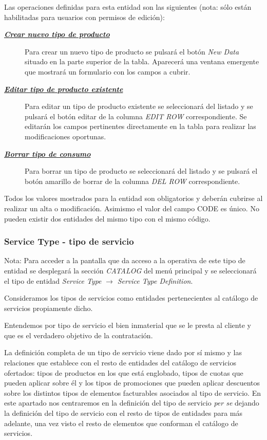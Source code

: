 Las operaciones definidas para esta entidad son las siguientes (nota: sólo están habilitadas para usuarios con permisos de edición):
\begin{description}
\item[\underline{\textsl{\textbf{Crear nuevo tipo de producto}}}] Para crear un nuevo tipo de producto se pulsará el botón \textit{New Data} situado en la parte superior de la tabla. Aparecerá una ventana emergente que mostrará un formulario con los campos a cubrir.

\item[\underline{\textsl{\textbf{Editar tipo de producto existente}}}] Para editar un tipo de producto existente se seleccionará del listado y se pulsará el botón editar de la columna \textit{EDIT ROW} correspondiente. Se editarán los campos pertinentes directamente en la tabla para realizar las modificaciones oportunas. 

\item[\underline{\textsl{\textbf{Borrar tipo de consumo}}}] Para borrar un tipo de producto se seleccionará del listado y se pulsará el botón amarillo de borrar de la columna \textit{DEL ROW} correspondiente.
\end{description}

Todos los valores mostrados para la entidad son obligatorios y deberán cubrirse al realizar un alta o modificación. Asimismo el valor del campo CODE es único. No pueden existir dos entidades del mismo tipo con el mismo código.




\subsubsection{Service Type - tipo de servicio}
\label{sub:service-type}

Nota: Para acceder a la pantalla que da acceso a la operativa de este tipo de entidad se desplegará la sección \emph{CATALOG} del menú principal y se seleccionará el tipo de entidad \emph{Service Type} $\rightarrow$  \emph{Service Type Definition}.

Consideramos los tipos de servicios como entidades pertenecientes al catálogo de servicios propiamente dicho.

Entendemos por tipo de servicio el bien inmaterial que se le presta al cliente y que es el verdadero objetivo de la contratación.

La definición completa de un tipo de servicio viene dado por sí mismo y las relaciones que establece con el resto de entidades del catálogo de servicios ofertados: tipos de productos en los que está englobado, tipos de cuotas que pueden aplicar sobre él y los tipos de promociones que pueden aplicar descuentos sobre los distintos tipos de elementos facturables asociados al tipo de servicio. En este apartado nos centraremos en la definición del tipo de servicio \textit{per se} dejando la definición del tipo de servicio con el resto de tipos de entidades para más adelante, una vez visto el resto de elementos que conforman el catálogo de servicios.

